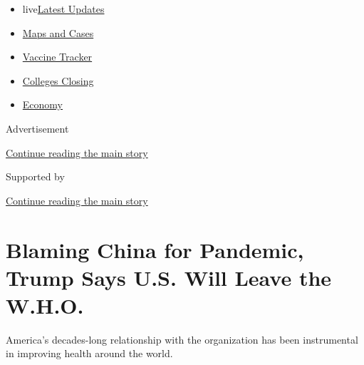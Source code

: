 \begin{itemize}
\tightlist
\item
  live\href{https://www.nytimes3xbfgragh.onion/2020/08/20/world/coronavirus-covid.html?name=styln-coronavirus-national\&region=TOP_BANNER\&variant=undefined\&block=storyline_menu_recirc\&action=click\&pgtype=Article\&impression_id=90041c21-e387-11ea-ab24-c151c34c6c9f}{Latest
  Updates}
\item
  \href{https://www.nytimes3xbfgragh.onion/interactive/2020/us/coronavirus-us-cases.html?name=styln-coronavirus-national\&region=TOP_BANNER\&variant=undefined\&block=storyline_menu_recirc\&action=click\&pgtype=Article\&impression_id=90041c22-e387-11ea-ab24-c151c34c6c9f}{Maps
  and Cases}
\item
  \href{https://www.nytimes3xbfgragh.onion/interactive/2020/science/coronavirus-vaccine-tracker.html?name=styln-coronavirus-national\&region=TOP_BANNER\&variant=undefined\&block=storyline_menu_recirc\&action=click\&pgtype=Article\&impression_id=90041c23-e387-11ea-ab24-c151c34c6c9f}{Vaccine
  Tracker}
\item
  \href{https://www.nytimes3xbfgragh.onion/2020/08/19/us/colleges-closing-covid.html?name=styln-coronavirus-national\&region=TOP_BANNER\&variant=undefined\&block=storyline_menu_recirc\&action=click\&pgtype=Article\&impression_id=90041c24-e387-11ea-ab24-c151c34c6c9f}{Colleges
  Closing}
\item
  \href{https://www.nytimes3xbfgragh.onion/live/2020/08/20/business/stock-market-today-coronavirus?name=styln-coronavirus-national\&region=TOP_BANNER\&variant=undefined\&block=storyline_menu_recirc\&action=click\&pgtype=Article\&impression_id=90041c25-e387-11ea-ab24-c151c34c6c9f}{Economy}
\end{itemize}

Advertisement

\protect\hyperlink{after-top}{Continue reading the main story}

Supported by

\protect\hyperlink{after-sponsor}{Continue reading the main story}

\hypertarget{blaming-china-for-pandemic-trump-says-us-will-leave-the-who}{%
\section{Blaming China for Pandemic, Trump Says U.S. Will Leave the
W.H.O.}\label{blaming-china-for-pandemic-trump-says-us-will-leave-the-who}}

America's decades-long relationship with the organization has been
instrumental in improving health around the world.

